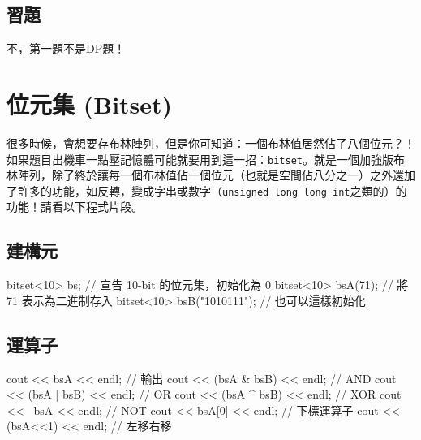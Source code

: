 \documentclass[main.tex]{subfiles}
\begin{document}
\subsection{習題}
不，第一題不是DP題！
\section{位元集 (Bitset)}
很多時候，會想要存布林陣列，但是你可知道：一個布林值居然佔了八個位元？！如果題目出機車一點壓記憶體可能就要用到這一招：\texttt{bitset}。就是一個加強版布林陣列，除了終於讓每一個布林值佔一個位元（也就是空間佔八分之一）之外還加了許多的功能，如反轉，變成字串或數字（\texttt{unsigned long long int}之類的）的功能！請看以下程式片段。
\subsection{建構元}
\begin{C++}
bitset<10> bs; // 宣告 10-bit 的位元集，初始化為 0
bitset<10> bsA(71); // 將 71 表示為二進制存入
bitset<10> bsB("1010111"); // 也可以這樣初始化
\end{C++}
\subsection{運算子}
\begin{C++}
cout << bsA << endl; // 輸出
cout << (bsA & bsB) << endl; // AND
cout << (bsA | bsB) << endl; // OR
cout << (bsA ^ bsB) << endl; // XOR
cout << ~bsA << endl; // NOT
cout << bsA[0] << endl; // 下標運算子
cout << (bsA<<1) << endl; // 左移右移
\end{C++}
\end{document}
